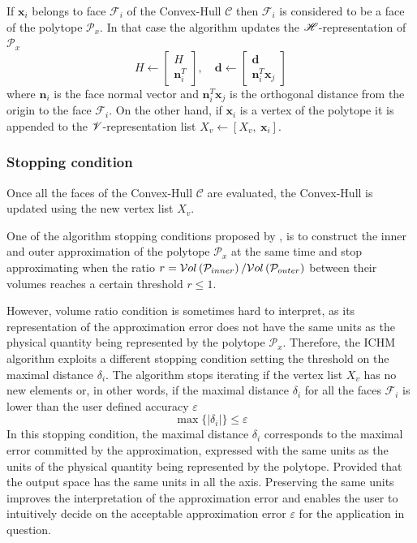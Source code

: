 If $\bm{x}_i$ belongs to face $\mathcal{F}_i$ of the Convex-Hull $\mathcal{C}$ then  $\mathcal{F}_i$ is considered to be a face of the polytope $\mathcal{P}_x$. In that case the algorithm updates the $\mathscr{H}$-representation of $\mathcal{P}_x$ 
\begin{equation}
    H \leftarrow \begin{bmatrix} H \\ \bm{n}_i^T\end{bmatrix}, \quad \bm{d} \leftarrow \begin{bmatrix}  \bm{d} \\ \bm{n}^T_i \bm{x}_{j} \end{bmatrix}
\label{eq:h_rep}
\end{equation}
where $\bm{n}_i$ is the face normal vector and $\bm{n}_i^T \bm{x}_{j}$ is the orthogonal distance from the origin to the face $\mathcal{F}_i$. On the other hand, if $\bm{x}_i$ is a vertex of the polytope it is appended to the $\mathscr{V}$-representation list $X_v \leftarrow [X_v, ~\bm{x}_i]$.

\subsubsection{Stopping condition} 
Once all the faces of the Convex-Hull $\mathcal{C}$ are evaluated, the Convex-Hull is updated using the new vertex list $X_v$.

One of the algorithm stopping conditions proposed by \citet{Bretl2008}, is to construct the inner and outer approximation of the polytope $\mathcal{P}_x$ at the same time and stop approximating when the ratio $r=\mathcal{V}ol\left(\mathcal{P}_{inner}\right)/\mathcal{V}ol\left(\mathcal{P}_{outer}\right)$ between their volumes reaches a certain threshold $r\leq1$.  

However, volume ratio condition is sometimes hard to interpret, as its representation of the approximation error does not have the same units as the physical quantity being represented by the polytope $\mathcal{P}_x$. Therefore, the ICHM algorithm exploits a different stopping condition setting the threshold on the maximal distance $\delta_i$. The algorithm stops iterating if the vertex list $X_v$ has no new elements or, in other words, if the maximal distance $\delta_i$ for all the faces $\mathcal{F}_i$ is lower than the user defined accuracy $\varepsilon$  
\begin{equation}
    \max\{|\delta_{i}|\} \leq \varepsilon
\end{equation}
In this stopping condition, the maximal distance $\delta_i$ corresponds to the maximal error committed by the approximation, expressed with the same units as the units of the physical quantity being represented by the polytope. Provided that the output space has the same units in all the axis. Preserving the same units improves the interpretation of the approximation error and enables the user to intuitively decide on the acceptable approximation error $\varepsilon$ for the application in question. 

